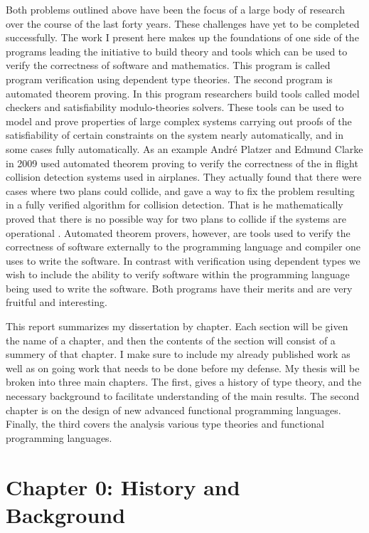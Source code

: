 Both problems outlined above have been the focus of a large body of
research over the course of the last forty years.  These challenges
have yet to be completed successfully.  The work I present here makes
up the foundations of one side of the programs leading the initiative
to build theory and tools which can be used to verify the correctness
of software and mathematics.  This program is called program
verification using dependent type theories.  The second program is
automated theorem proving.  In this program researchers build tools
called model checkers and satisfiability modulo-theories solvers.
These tools can be used to model and prove properties of large complex
systems carrying out proofs of the satisfiability of certain
constraints on the system nearly automatically, and in some cases
fully automatically.  As an example Andr\'{e} Platzer and Edmund
Clarke in 2009 used automated theorem proving to verify the
correctness of the in flight collision detection systems used in
airplanes.  They actually found that there were cases where two plans
could collide, and gave a way to fix the problem resulting in a fully
verified algorithm for collision detection.  That is he mathematically
proved that there is no possible way for two plans to collide if the
systems are operational \cite{DBLP:conf/fm/PlatzerC09}.  Automated
theorem provers, however, are tools used to verify the correctness of
software externally to the programming language and compiler one uses
to write the software.  In contrast with verification using dependent
types we wish to include the ability to verify software within the
programming language being used to write the software. Both programs
have their merits and are very fruitful and interesting.

This report summarizes my dissertation by chapter.  Each section will
be given the name of a chapter, and then the contents of the section
will consist of a summery of that chapter.  I make sure to include my
already published work as well as on going work that needs to be done
before my defense.  My thesis will be broken into three main chapters.
The first, gives a history of type theory, and the necessary
background to facilitate understanding of the main results. The second
chapter is on the design of new advanced functional programming
languages.  Finally, the third covers the analysis various type
theories and functional programming languages.

\section{Chapter 0: History and Background}
\label{sec:history_and_background}

